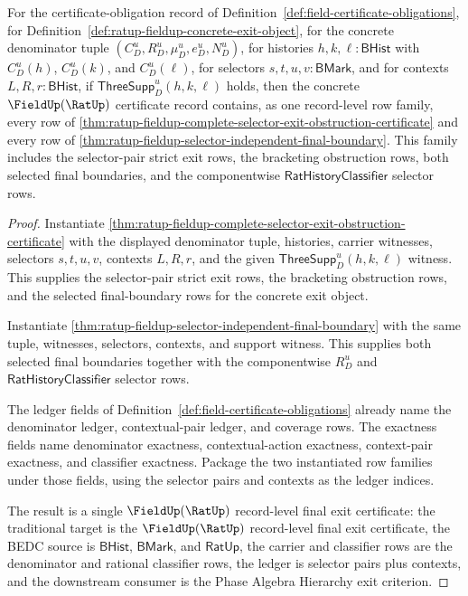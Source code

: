 \begin{theorem}
\label{thm:ratup-fieldup-certificate-record-absorbs-selector-independent-exit}
For the certificate-obligation record of
Definition~\ref{def:field-certificate-obligations}, for
Definition~\ref{def:ratup-fieldup-concrete-exit-object}, for the concrete
denominator tuple $(C_D^u,R_D^u,\mu_D^u,e_D^u,N_D^u)$, for histories
$h,k,\ell:\mathsf{BHist}$ with $C_D^u(h)$, $C_D^u(k)$, and $C_D^u(\ell)$, for
selectors $s,t,u,v:\mathsf{BMark}$, and for contexts
$L,R,r:\mathsf{BHist}$, if $\mathsf{ThreeSupp}_D^u(h,k,\ell)$ holds, then the
concrete $\FieldUp(\RatUp)$ certificate record contains, as one record-level
row family, every row of
\autoref{thm:ratup-fieldup-complete-selector-exit-obstruction-certificate} and
every row of
\autoref{thm:ratup-fieldup-selector-independent-final-boundary}. This family
includes the selector-pair strict exit rows, the bracketing obstruction rows,
both selected final boundaries, and the componentwise
$\mathsf{RatHistoryClassifier}$ selector rows.
\end{theorem}
\begin{proof}
Instantiate
\autoref{thm:ratup-fieldup-complete-selector-exit-obstruction-certificate} with
the displayed denominator tuple, histories, carrier witnesses, selectors
$s,t,u,v$, contexts $L,R,r$, and the given
$\mathsf{ThreeSupp}_D^u(h,k,\ell)$ witness. This supplies the selector-pair
strict exit rows, the bracketing obstruction rows, and the selected
final-boundary rows for the concrete exit object.

Instantiate
\autoref{thm:ratup-fieldup-selector-independent-final-boundary} with the same
tuple, witnesses, selectors, contexts, and support witness. This supplies both
selected final boundaries together with the componentwise
$R_D^u$ and $\mathsf{RatHistoryClassifier}$ selector rows.

The ledger fields of Definition~\ref{def:field-certificate-obligations} already
name the denominator ledger, contextual-pair ledger, and coverage rows. The
exactness fields name denominator exactness, contextual-action exactness,
context-pair exactness, and classifier exactness. Package the two instantiated
row families under those fields, using the selector pairs and contexts as the
ledger indices.

The result is a single $\FieldUp(\RatUp)$ record-level final exit certificate:
the traditional target is the $\FieldUp(\RatUp)$ record-level final exit
certificate, the BEDC source is $\mathsf{BHist}$, $\mathsf{BMark}$, and
$\mathsf{RatUp}$, the carrier and classifier rows are the denominator and
rational classifier rows, the ledger is selector pairs plus contexts, and the
downstream consumer is the Phase Algebra Hierarchy exit criterion.
\end{proof}

